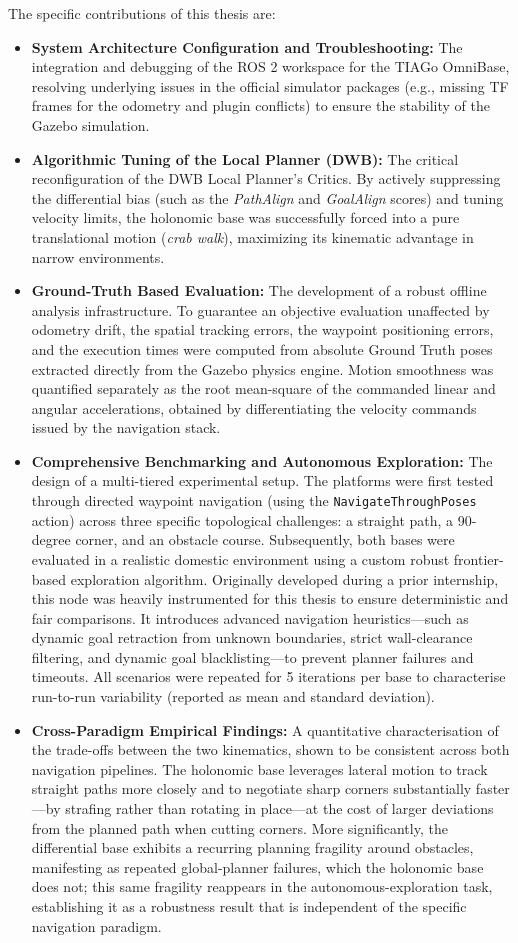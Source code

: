 The specific contributions of this thesis are:
\begin{itemize}
    \item \textbf{System Architecture Configuration and Troubleshooting:} The integration and debugging of the ROS 2 workspace for the TIAGo OmniBase, resolving underlying issues in the official simulator packages (e.g., missing TF frames for the odometry and plugin conflicts) to ensure the stability of the Gazebo simulation.
    \item \textbf{Algorithmic Tuning of the Local Planner (DWB):} The critical reconfiguration of the DWB Local Planner's Critics. By actively suppressing the differential bias (such as the \textit{PathAlign} and \textit{GoalAlign} scores) and tuning velocity limits, the holonomic base was successfully forced into a pure translational motion (\textit{crab walk}), maximizing its kinematic advantage in narrow environments.
    \item \textbf{Ground-Truth Based Evaluation:} The development of a robust offline analysis infrastructure. To guarantee an objective evaluation unaffected by odometry drift, the spatial tracking errors, the waypoint positioning errors, and the execution times were computed from absolute Ground Truth poses extracted directly from the Gazebo physics engine. Motion smoothness was quantified separately as the root mean-square of the commanded linear and angular accelerations, obtained by differentiating the velocity commands issued by the navigation stack.
    \item \textbf{Comprehensive Benchmarking and Autonomous Exploration:} The design of a multi-tiered experimental setup. The platforms were first tested through directed waypoint navigation (using the \texttt{NavigateThroughPoses} action) across three specific topological challenges: a straight path, a 90-degree corner, and an obstacle course. Subsequently, both bases were evaluated in a realistic domestic environment using a custom robust frontier-based exploration algorithm. Originally developed during a prior internship, this node was heavily instrumented for this thesis to ensure deterministic and fair comparisons. It introduces advanced navigation heuristics—such as dynamic goal retraction from unknown boundaries, strict wall-clearance filtering, and dynamic goal blacklisting—to prevent planner failures and timeouts. All scenarios were repeated for 5 iterations per base to characterise run-to-run variability (reported as mean and standard deviation).
    \item \textbf{Cross-Paradigm Empirical Findings:} A quantitative characterisation of the trade-offs between the two kinematics, shown to be consistent across both navigation pipelines. The holonomic base leverages lateral motion to track straight paths more closely and to negotiate sharp corners substantially faster---by strafing rather than rotating in place---at the cost of larger deviations from the planned path when cutting corners. More significantly, the differential base exhibits a recurring planning fragility around obstacles, manifesting as repeated global-planner failures, which the holonomic base does not; this same fragility reappears in the autonomous-exploration task, establishing it as a robustness result that is independent of the specific navigation paradigm.

\end{itemize}

